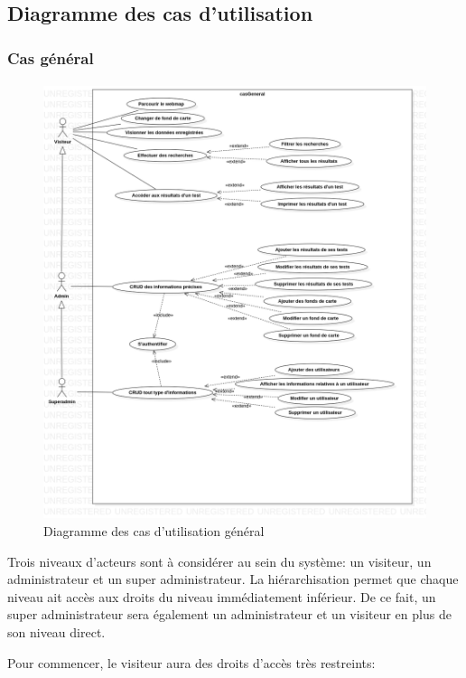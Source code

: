 \subsection{Diagramme des cas d'utilisation}
    \subsubsection{Cas général}
    \paragraph{}
    \begin{figure}
        \centering
        \includegraphics[width=1\textwidth]{casGeneral.png}
        \caption{Diagramme des cas d'utilisation général}
    \end{figure}
    Trois niveaux d'acteurs sont à considérer au sein du système: un visiteur, 
    un administrateur et un super administrateur. La hiérarchisation permet que 
    chaque niveau ait accès aux droits du niveau immédiatement inférieur. 
    De ce fait, un super administrateur sera également un administrateur et 
    un visiteur en plus de son niveau direct. \par 
Pour commencer, le visiteur aura des droits d'accès très restreints: \par 
